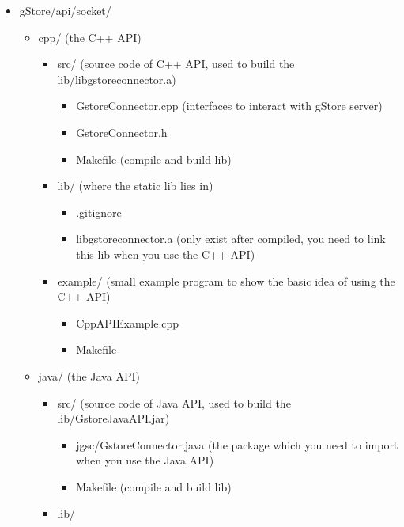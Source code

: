 \documentclass[titlepage, a4paper, 12pt]{article}
\begin{document}
\begin{itemize}
\item
  gStore/api/socket/

  \begin{itemize}
  \item
    cpp/ (the C++ API)

    \begin{itemize}
    \item
      src/ (source code of C++ API, used to build the
      lib/libgstoreconnector.a)

      \begin{itemize}
      \item
        GstoreConnector.cpp (interfaces to interact with gStore server)
      \item
        GstoreConnector.h
      \item
        Makefile (compile and build lib)
      \end{itemize}
    \item
      lib/ (where the static lib lies in)

      \begin{itemize}
      \item
        .gitignore
      \item
        libgstoreconnector.a (only exist after compiled, you need to
        link this lib when you use the C++ API)
      \end{itemize}
    \item
      example/ (small example program to show the basic idea of using
      the C++ API)

      \begin{itemize}
      \item
        CppAPIExample.cpp
      \item
        Makefile
      \end{itemize}
    \end{itemize}
  \item
    java/ (the Java API)

    \begin{itemize}
    \item
      src/ (source code of Java API, used to build the
      lib/GstoreJavaAPI.jar)

      \begin{itemize}
      \item
        jgsc/GstoreConnector.java (the package which you need to import when you use the Java API)
      \item
        Makefile (compile and build lib)
      \end{itemize}
    \item
      lib/


\end{itemize}
\end{itemize}
\end{itemize}
\end{document}
